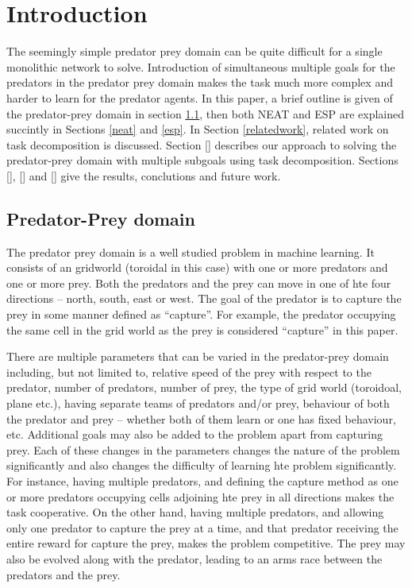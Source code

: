 \section{Introduction}
The seemingly simple predator prey domain can be quite difficult for a single monolithic network to solve. Introduction of simultaneous multiple goals for the predators in the predator prey domain makes the task much more complex and harder to learn for the predator agents.
    In this paper, a brief outline is given of the predator-prey domain in section \ref{predprey}, then both NEAT and ESP are explained succintly in Sections \ref{neat} and \ref{esp}. In Section \ref{relatedwork}, related work on task decomposition is discussed. Section [] describes our approach to solving the predator-prey domain with multiple subgoals using task decomposition. Sections [], [] and [] give the results, conclutions and future work.

\subsection{Predator-Prey domain}
\label{predprey}
The predator prey domain is a well studied problem in machine learning. It consists of an gridworld (toroidal in this case) with one or more predators and one or more prey. Both the predators and the prey can move in one of hte four directions -- north, south, east or west. The goal of the predator is to capture the prey in some manner defined as “capture”. For example, the predator occupying the same cell in the grid world as the prey is considered “capture” in this paper.

    There are multiple parameters that can be varied in the predator-prey domain including, but not limited to, relative speed of the prey with respect to the predator, number of predators, number of prey, the type of grid world (toroidoal, plane etc.), having separate teams of predators and/or prey, behaviour of both the predator and prey -- whether both of them learn or one has fixed behaviour, etc. Additional goals may also be added to the problem apart from capturing prey. Each of these changes in the parameters changes the nature of the problem significantly and also changes the difficulty of learning hte problem significantly. For instance, having multiple predators, and defining the capture method as one or more predators occupying cells adjoining hte prey in all directions makes the task cooperative. On the other hand, having multiple predators, and allowing only one predator to capture the prey at a time, and that predator receiving the entire reward for capture the prey, makes the problem competitive. The prey may also be evolved along with the predator, leading to an arms race between the predators and the prey.


